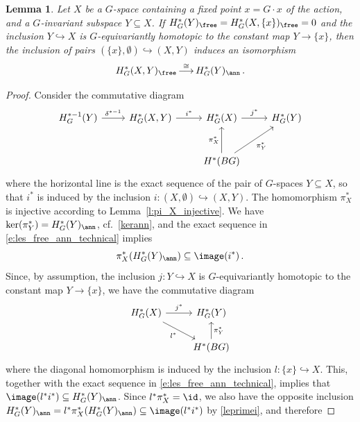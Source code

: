 \documentclass[11pt,a4paper,reqno]{article}
\DeclareMathOperator*{\toup}{\longrightarrow}
\numberwithin{equation}{section}
\newtheorem{lemma}[theorem]{Lemma}
\theoremstyle{definition}
\begin{document}
\begin{lemma}\label{l:free_ann_technical}
Let $X$ be a $G$-space containing a fixed point $x=G\cdot x$ of the  action, and  a $G$-invariant subspace $Y\subseteq X$. If $H^*_G(Y)_\free=H_G^*(X,\{x\})_\free=0$ and the inclusion $Y\hookrightarrow X$ is $G$-equivariantly homotopic to the constant map $Y\to\{x\}$, then the inclusion of pairs $(\{x\},\emptyset)\hookrightarrow (X,Y)$ induces an  isomorphism
\[
H^*_G(X,Y)_\free\toup^{\cong} H^*_G(Y)_\ann \, .
\]
\end{lemma}

\begin{proof}
Consider the commutative diagram
\begin{equation}
\label{e:les_free_ann_technical}
\begin{tikzcd}[row sep=large]
    H_G^{*-1}(Y)
    \arrow[r, "\delta^{*-1}"]
    &  
    H_G^*(X,Y)
    \arrow[r, "i^*"]
    &  
    H_G^*(X)
    \arrow[r, "j^*"]
    &  
    H_G^*(Y)\\
    &&
    H^*(BG)
    \arrow[u,  "\pi_X^*"]
    \arrow[ur, "\pi_Y^*"']
\end{tikzcd}
\end{equation}
where the horizontal line is the exact sequence of the pair of $G$-spaces $Y\subseteq X$, 
so that $i^*$ is induced by the inclusion  $i : (X, \emptyset)  \hookrightarrow(X,Y)$. 
The homomorphism $\pi_X^*$ is injective according to Lemma~\ref{l:pi_X_injective}.  We have 
$\ker(\pi_Y^*)=H^*_G(Y)_\ann$, cf.~\eqref{kerann}, and  the exact sequence in \eqref{e:les_free_ann_technical} implies 
\begin{equation}
\label{leprimei}
\pi_X^*(H^*_G(Y)_\ann)\subseteq\image(i^*) \, .
\end{equation}
Since, by assumption,  the inclusion $j:Y\hookrightarrow X$ is $G$-equivariantly homotopic to the constant map
$Y\to\{x\}$, we have the commutative diagram
\begin{equation*}
\begin{tikzcd}
    H_G^*(X)
    \arrow[r, "j^*"]
    \arrow[dr, "l^*"']
    &  
    H_G^*(Y)\\
    & 
    H^*(BG)
    \arrow[u, "\pi_Y^*"']
\end{tikzcd}
\end{equation*}
where the diagonal homomorphism is induced by the inclusion $l:\{x\}\hookrightarrow X$.
This, together with the exact sequence in \eqref{e:les_free_ann_technical}, implies that $\image(l^*i^*)\subseteq H^*_G(Y)_\ann$.
Since $l^*\pi_X^*=\id$, we also have the opposite inclusion $H^*_G(Y)_\ann=l^*\pi_X^* (H^*_G(Y)_\ann)\subseteq\image(l^*i^*)$ by \eqref{leprimei}, and therefore

\end{proof}
\end{document}
